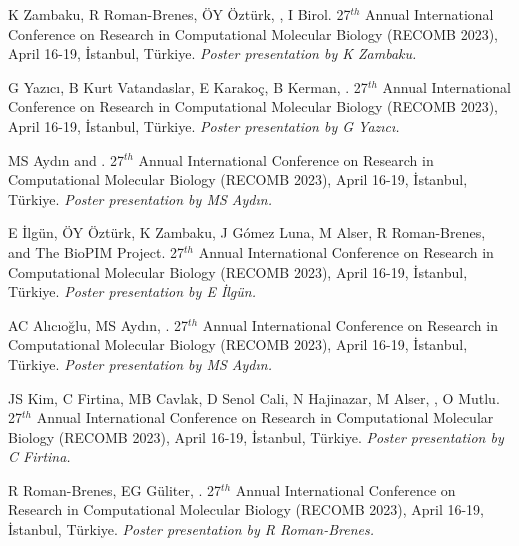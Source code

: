  K Zambaku, R Roman-Brenes, ÖY Öztürk, \calkan{}, I Birol. 27$^{th}$ Annual International Conference on Research in Computational Molecular Biology (RECOMB 2023), April 16-19, İstanbul, Türkiye. {\it Poster presentation by K Zambaku.}


\vspace{-.2cm}{\bf Identification of protein-protein interaction
bridges in multiple sclerosis.} G Yazıcı, B Kurt Vatandaslar, E Karakoç, B Kerman, \calkan{}.
27$^{th}$ Annual International Conference on Research in Computational Molecular Biology (RECOMB 2023), April 16-19, İstanbul, Türkiye.
{\it Poster presentation by G Yazıcı.}

\vspace{-.2cm}{\bf Whole genome alignment via Alternating Lyndon Factorization Tree traversal.} MS Aydın and \calkan{}. 27$^{th}$ Annual International Conference on Research in Computational Molecular Biology (RECOMB 2023), April 16-19, İstanbul, Türkiye. {\it Poster presentation by MS Aydın.}

\vspace{-.2cm}{\bf Characterization of alignment and search algorithms for short read, long read, and graph mappers.} E İlgün, ÖY Öztürk, K Zambaku, J Gómez Luna, M Alser, R Roman-Brenes, \calkan{} and The BioPIM Project. 27$^{th}$ Annual International Conference on Research in Computational Molecular Biology (RECOMB 2023), April 16-19, İstanbul, Türkiye. {\it Poster presentation by E İlgün.}

\vspace{-.2cm}{\bf Pairwise sequence alignment with block and character edit operations.} AC Alıcıoğlu, MS Aydın, \calkan{}. 27$^{th}$ Annual International Conference on Research in Computational Molecular Biology (RECOMB 2023), April 16-19, İstanbul, Türkiye. {\it Poster presentation by MS Aydın.}

\vspace{-.2cm}{\bf AirLift: a fast and comprehensive technique for remapping alignments between reference genomes.} JS Kim, C Firtina, MB Cavlak, D Senol Cali, N Hajinazar, M Alser, \calkan{}, O Mutlu. 27$^{th}$ Annual International Conference on Research in Computational Molecular Biology (RECOMB 2023), April 16-19, İstanbul, Türkiye. {\it Poster presentation by C Firtina.}

\vspace{-.2cm}{\bf Fast identification of sepsis antibiotic resistance.}  R Roman-Brenes, EG Güliter,  \calkan{}. 27$^{th}$ Annual International Conference on Research in Computational Molecular Biology (RECOMB 2023), April 16-19, İstanbul, Türkiye. {\it Poster presentation by R Roman-Brenes.}

